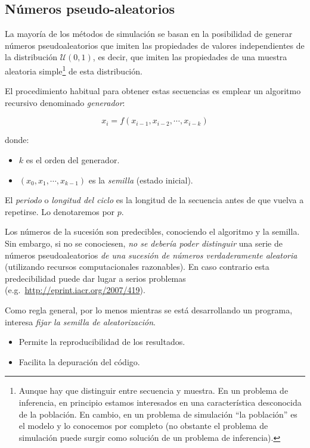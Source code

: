 \documentclass[
]{book}
\theoremstyle{break}
\theoremstyle{nonumberplain}
\begin{document}
\hypertarget{nuxfameros-pseudo-aleatorios}{%
\subsection{Números pseudo-aleatorios}\label{nuxfameros-pseudo-aleatorios}}

La mayoría de los métodos de simulación se basan en la posibilidad de generar números pseudoaleatorios que imiten las propiedades de valores independientes de la distribución \(\mathcal{U}(0,1)\), es decir, que imiten las propiedades de una muestra aleatoria simple\footnote{Aunque hay que distinguir entre secuencia y muestra. En un problema de inferencia, en principio estamos interesados en una característica desconocida de la población. En cambio, en un problema de simulación ``la población'' es el modelo y lo conocemos por completo (no obstante el problema de simulación puede surgir como solución de un problema de inferencia).} de esta distribución.

El procedimiento habitual para obtener estas secuencias es emplear un algoritmo recursivo denominado \emph{generador}:

\[x_{i} = f\left( x_{i-1}, x_{i-2}, \cdots, x_{i-k}\right)\]

donde:

\begin{itemize}
\item
  \(k\) es el orden del generador.
\item
  \(\left( x_{0},x_{1},\cdots,x_{k-1}\right)\) es la \emph{semilla}
  (estado inicial).
\end{itemize}

El \emph{periodo} o \emph{longitud del ciclo} es la longitud de la secuencia antes de que vuelva a repetirse. Lo denotaremos por \(p\).

Los números de la sucesión son predecibles, conociendo el algoritmo y la semilla.
Sin embargo, si no se conociesen, \emph{no se debería poder distinguir} una serie de números pseudoaleatorios \emph{de una sucesión de números verdaderamente aleatoria} (utilizando recursos computacionales razonables).
En caso contrario esta predecibilidad puede dar lugar a serios
problemas (e.g.~\url{http://eprint.iacr.org/2007/419}).

Como regla general, por lo menos mientras se está desarrollando un
programa, interesa \emph{fijar la semilla de aleatorización}.

\begin{itemize}
\item
  Permite la reproducibilidad de los resultados.
\item
  Facilita la depuración del código.
\end{itemize}
\end{document}
